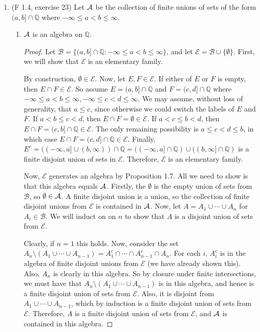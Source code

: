 \documentclass[10pt]{article}
\newcommand{\Q}{\mathbb{Q}}
\begin{document}
\begin{enumerate}
\item (F 1.4, exercise 23) Let $\mathcal{A}$ be the collection of finite unions of sets of the form $(a,b] \cap \Q$ where $- \infty \leq a < b \leq \infty$.
\begin{enumerate}
\item $\mathcal{A}$ is an algebra on $\Q$.

\newcommand{\B}{\mathcal{B}}
\newcommand{\E}{\mathcal{E}}

\begin{proof}
Let $\B = \{(a,b] \cap \Q : - \infty \leq a < b \leq \infty \}$, and let $\E = \B \cup \{\emptyset \}$.  First, we will show that $\E$ is an elementary family.

By construction, $\emptyset \in \E$.  Now, let $E, F \in \E$.  If either of $E$ or $F$ is empty, then $E \cap F \in \E$.  So assume $E = (a,b] \cap \Q$ and $F = (c,d] \cap \Q$ where $-\infty \leq a < b \leq \infty, -\infty \leq c < d \leq \infty$.  We may assume, without loss of generality, that $a \leq c$, since otherwise we could switch the labels of $E$ and $F$.  If $a < b \leq c < d$, then $E \cap F = \emptyset \in \E$.  If $a < c \leq b < d$, then $E \cap F = (c,b] \cap \Q \in \E$.  The only remaining possibility is $a \leq c < d \leq b$, in which case $E \cap F = (c,d] \cap \Q \in \E$.  Finally, $E^c = ((-\infty,a] \cup (b, \infty)) \cap \Q = ((-\infty,a] \cap \Q) \cup ((b, \infty] \cap \Q)$ is a finite disjoint union of sets in $\E$.  Therefore, $\E$ is an elementary family.

Now, $\E$ generates an algebra by Proposition 1.7.  All we need to show is that this algebra equals $\mathcal{A}$.  Firstly, the $\emptyset$ is the empty union of sets from $\B$, so $\emptyset \in \mathcal{A}$.  A finite disjoint union is a union, so the collection of finite disjoint unions from $\E$ is contained in $\mathcal{A}$.  Now, let $A = A_1 \cup \cdots \cup A_n$ for $A_i \in \B$.  We will induct on on $n$ to show that $A$ is a disjoint union of sets from $\E$.

Clearly, if $n = 1$ this holds.  Now, consider the set $A_n \setminus (A_1 \cup \cdots \cup A_{n-1}) = A_1^c \cap \cdots \cap A_{n-1}^c \cap A_n$.  For each $i$, $A_i^c$ is in the algebra of finite disjoint unions from $\E$ (we have already shown this).  Also, $A_n$ is clearly in this algebra.  So by closure under finite intersections, we must have that $A_n \setminus (A_1 \cup \cdots \cup A_{n-1})$ is in this algebra, and hence is a finite disjoint union of sets from $\E$.  Also, it is disjoint from $A_1 \cup \cdots \cup A_{n-1}$, which by induction is a finite disjoint union of sets from $\E$.  Therefore, $A$ is a finite disjoint union of sets from $\E$, and $\mathcal{A}$ is contained in this algebra.


\end{proof}
\end{enumerate}
\end{enumerate}
\end{document}
